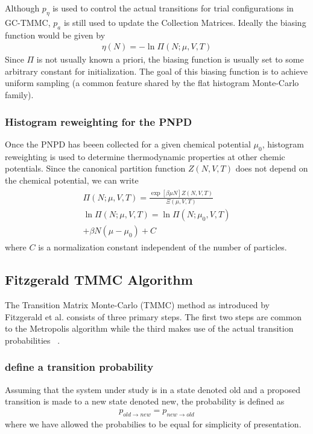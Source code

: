 \documentclass[letterpaper,twocolumn,amsmath,amssymb,pre,aps,10pt]{revtex4-1}
\begin{document}
Although $p_{\eta}$ is used to control the actual transitions for trial configurations
in GC-TMMC, $p_{a}$ is still used to update the Collection Matrices.  Ideally the biasing
function would be given by 
\begin{align}
  \eta(N) = -\ln\Pi(N;\mu,V,T)
\end{align}
Since $\Pi$ is not usually known a priori, the biasing function is usually set to some 
arbitrary constant for initialization.  The goal of this biasing function is to achieve
uniform sampling (a common feature shared by the flat histogram Monte-Carlo family).

\subsubsection{Histogram reweighting for the PNPD}
Once the PNPD has beeen collected for a given chemical potential $\mu_0$, histogram 
reweighting is used to determine thermodynamic properties at other chemic potentials.  
Since the canonical partition function $Z(N,V,T)$ does not depend on the chemical 
potential, we can write
\begin{align}
\begin{split}
  \Pi(N;\mu,V,T) = \frac{\exp[\beta\mu N]Z(N,V,T)}{\Xi(\mu,V,T)}\\
  \ln\Pi(N;\mu,V,T) = \ln\Pi(N;\mu_0,V,T) \\
  + \beta N(\mu-\mu_0) + C
\end{split}
\end{align}
where $C$ is a normalization constant independent of the number of particles.

\subsection{Fitzgerald TMMC Algorithm}
The Transition Matrix Monte-Carlo (TMMC) method as introduced by Fitzgerald et al.
consists of three primary steps.  The first two steps are common to the Metropolis 
algorithm while the third makes use of the actual transition probabilities
~\cite{fitzgerald2000monte}.

\subsubsection{define a transition probability}
Assuming that the system under study is in a state denoted old and a proposed transition
is made to a new state denoted new, the probability is defined as
\begin{align}
  p_{old \rightarrow new} = p_{new \rightarrow old}
\end{align}
where we have allowed the probabilies to be equal for simplicity of presentation.
\end{document}
